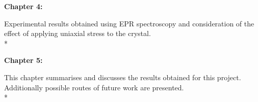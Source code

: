 \noindent \textbf{Chapter 4:} {\addtolength{\leftskip}{5 mm} Experimental results obtained using EPR spectroscopy and consideration of the effect of applying uniaxial stress to the crystal. \\*


}
\noindent \textbf{Chapter 5:} {\addtolength{\leftskip}{5 mm} This chapter summarises and discusses the results obtained for this project. Additionally possible routes of future work are presented. \\*


}



